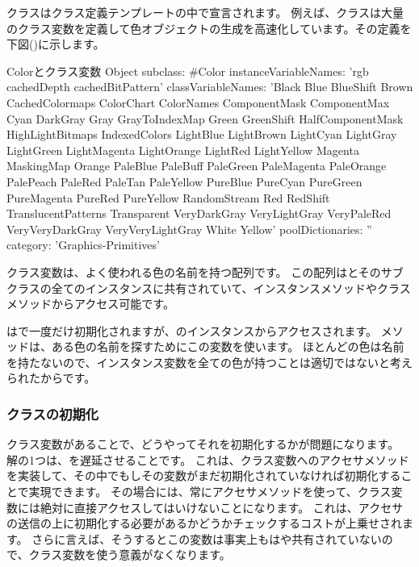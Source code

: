 \documentclass[a4paper,10pt,twoside]{book}
\begin{document}
クラスはクラス定義テンプレートの中で宣言されます。
例えば、クラスは大量のクラス変数を定義して色オブジェクトの生成を高速化しています。その定義を下図()に示します。
\begin{classdef}[Color]{Colorとクラス変数}
Object subclass: #Color 	
        instanceVariableNames: 'rgb cachedDepth cachedBitPattern'
        classVariableNames: 'Black Blue BlueShift Brown CachedColormaps ColorChart ColorNames ComponentMask ComponentMax Cyan DarkGray Gray GrayToIndexMap Green GreenShift HalfComponentMask HighLightBitmaps IndexedColors LightBlue LightBrown LightCyan LightGray LightGreen LightMagenta LightOrange LightRed LightYellow Magenta MaskingMap Orange PaleBlue PaleBuff PaleGreen PaleMagenta PaleOrange PalePeach PaleRed PaleTan PaleYellow PureBlue PureCyan PureGreen PureMagenta PureRed PureYellow RandomStream Red RedShift TranslucentPatterns Transparent VeryDarkGray VeryLightGray VeryPaleRed VeryVeryDarkGray VeryVeryLightGray White Yellow'
        poolDictionaries: '' 	
        category: 'Graphics-Primitives'
\end{classdef}

クラス変数は、よく使われる色の名前を持つ配列です。
この配列はとそのサブクラスの全てのインスタンスに共有されていて、インスタンスメソッドやクラスメソッドからアクセス可能です。%

はで一度だけ初期化されますが、のインスタンスからアクセスされます。
メソッドは、ある色の名前を探すためにこの変数を使います。
ほとんどの色は名前を持たないので、インスタンス変数を全ての色が持つことは適切ではないと考えられたからです。

\subsubsection{クラスの初期化}

クラス変数があることで、どうやってそれを初期化するかが問題になります。
解の1つは、を遅延させることです。
これは、クラス変数へのアクセサメソッドを実装して、その中でもしその変数がまだ初期化されていなければ初期化することで実現できます。
その場合には、常にアクセサメソッドを使って、クラス変数には絶対に直接アクセスしてはいけないことになります。
これは、アクセサの送信の上に初期化する必要があるかどうかチェックするコストが上乗せされます。
さらに言えば、そうするとこの変数は事実上もはや共有されていないので、クラス変数を使う意義がなくなります。
\end{document}
